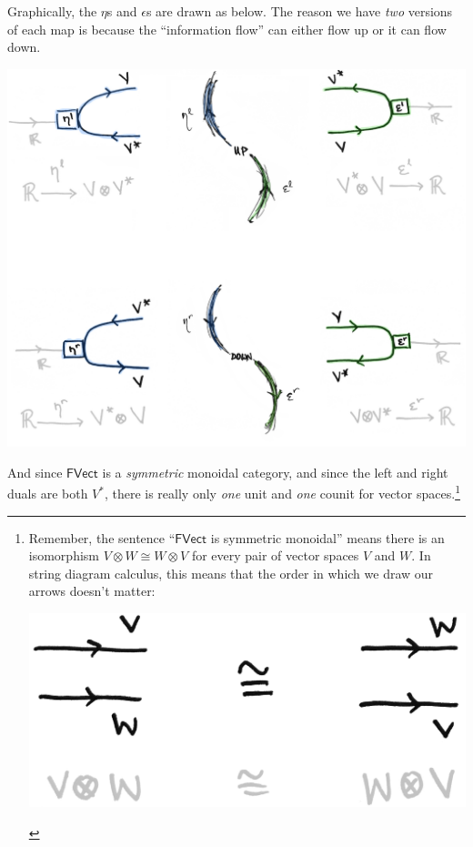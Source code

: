 \documentclass{tufte-handout-tai}
\theoremstyle{plain}
\theoremstyle{definition}
\theoremstyle{remark}
\begin{document}
Graphically, the $\eta$s and $\epsilon$s are drawn as below.
The reason we have \textit{two} versions of each map is because the ``information flow'' can either flow up or it can flow down.
\begin{center}
\includegraphics{updown.jpg}
\end{center}
And since $\mathsf{FVect}$ is a \textit{symmetric} monoidal category, and since the left and right duals are both $V^*$, there is really only \textit{one} unit and \textit{one} counit for vector spaces.\footnote[][-2cm]{Remember, the sentence ``$\mathsf{FVect}$ is symmetric monoidal'' means there is an isomorphism $V\otimes W\cong W\otimes V$ for every pair of vector spaces $V$ and $W.$ In string diagram calculus, this means that the order in which we draw our arrows doesn't matter:
	\begin{center}
	\includegraphics{symmetry.jpg}
	\end{center}}
\end{document}
